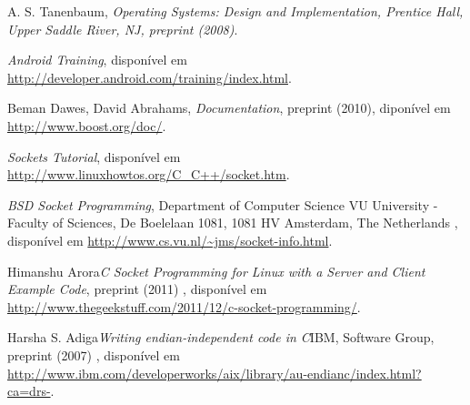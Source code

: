 \documentclass[12pt,a4paper]{article}
\begin{document}
\newpage
\begin{thebibliography}{99}


 A. S. Tanenbaum, {\it Operating Systems: Design and Implementation, Prentice Hall, Upper Saddle River, NJ, preprint (2008)}.

\bibitem \emph{Android Training}, disponível em 
\url{http://developer.android.com/training/index.html}.

 Beman Dawes, David Abrahams, \emph{Documentation},  preprint (2010), diponível em 
\url{http://www.boost.org/doc/}.

\bibitem\emph{Sockets Tutorial}, disponível em 
\url{http://www.linuxhowtos.org/C_C++/socket.htm}.


\bibitem{}\emph{BSD Socket Programming}{, Department of Computer Science
VU University - Faculty of Sciences, 
De Boelelaan 1081,
1081 HV Amsterdam, 
The Netherlands} , disponível em 
\url{http://www.cs.vu.nl/~jms/socket-info.html}.

 Himanshu Arora\emph{C Socket Programming for Linux with a Server and Client Example Code}{, preprint (2011)} , disponível em 
\url{http://www.thegeekstuff.com/2011/12/c-socket-programming/}.

 Harsha S. Adiga\emph{Writing endian-independent code in C}{IBM, Software Group, preprint (2007)} , disponível em 
\url{http://www.ibm.com/developerworks/aix/library/au-endianc/index.html?ca=drs-}.



\end{thebibliography}
\end{document}
